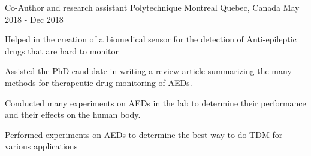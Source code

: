 \begin{cventries}
  \cventry
    {Co-Author and research assistant}
    {Polytechnique Montreal}
    {Quebec, Canada}
    {May 2018 - Dec 2018}
    {
      \begin{cvitems}
        \item {Helped in the creation of a biomedical sensor for the detection of Anti-epileptic drugs that are hard to monitor}
        \item {Assisted the PhD candidate in writing a review article summarizing the many methods for therapeutic drug monitoring of AEDs.}
        \item {Conducted many experiments on AEDs in the lab to determine their performance and their effects on the human body.}
        \item {Performed experiments on AEDs to determine the best way to do TDM for various applications}
      \end{cvitems}
    }
\end{cventries}